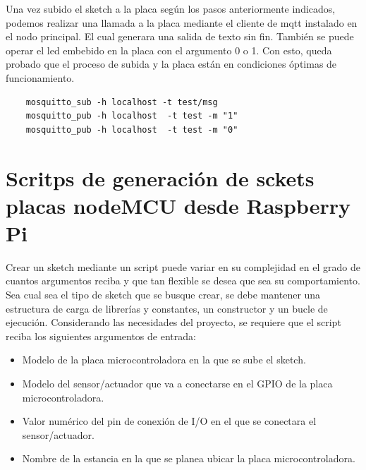 Una vez subido el sketch a la placa según los pasos anteriormente indicados, podemos realizar una llamada a la placa mediante el cliente de \gls{mqtt} instalado en el nodo principal. El cual generara una salida de texto sin fin. También se puede operar el led embebido en la placa con el argumento 0 o 1. Con esto, queda probado que el proceso de subida y la placa están en condiciones óptimas de funcionamiento.

\begin{verbatim}
    mosquitto_sub -h localhost -t test/msg
    mosquitto_pub -h localhost  -t test -m "1"
    mosquitto_pub -h localhost  -t test -m "0"
\end{verbatim}

\section{Scritps de generación de sckets placas nodeMCU desde Raspberry Pi}
\label{AppendiA:Key5}

Crear un sketch mediante un script puede variar en su complejidad en el grado de cuantos argumentos reciba y que tan flexible se desea que sea su comportamiento. Sea cual sea el tipo de sketch que se busque crear, se debe mantener una estructura de carga de librerías y constantes, un constructor y un bucle de ejecución. Considerando las necesidades del proyecto, se requiere que el script reciba los siguientes argumentos de entrada:

\begin{itemize}
  \item Modelo de la placa microcontroladora en la que se sube el sketch.

  \item Modelo del sensor/actuador que va a conectarse en el GPIO de la placa microcontroladora.

  \item Valor numérico del pin de conexión de I/O en el que se conectara el sensor/actuador.
  
  \item Nombre de la estancia en la que se planea ubicar la placa microcontroladora.
\end{itemize}

